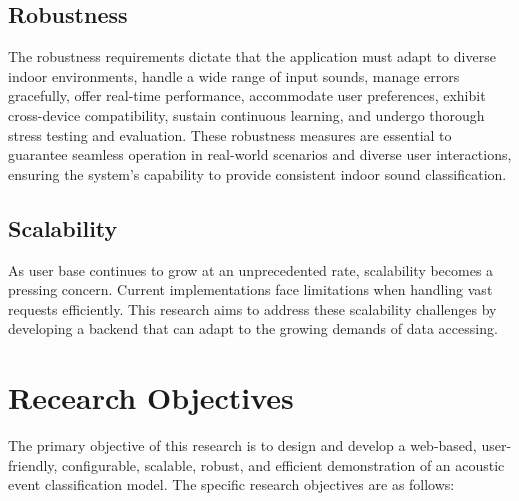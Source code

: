 \subsection{Robustness}


The robustness requirements dictate that the application must adapt to diverse indoor environments, handle a wide range of input sounds, manage errors gracefully, offer real-time performance, accommodate user preferences, exhibit cross-device compatibility, sustain continuous learning, and undergo thorough stress testing and evaluation. These robustness measures are essential to guarantee seamless operation in real-world scenarios and diverse user interactions, ensuring the system's capability to provide consistent indoor sound classification.

\subsection{Scalability}
As user base continues to grow at an unprecedented rate, scalability becomes a pressing concern\cite{9746093}. Current implementations face limitations when handling vast requests efficiently. This research aims to address these scalability challenges by developing a backend that can adapt to the growing demands of data accessing.

\section{Recearch Objectives}

The primary objective of this research is to design and develop a web-based, user-friendly, configurable, scalable, robust, and efficient demonstration of an acoustic event classification model. The specific research objectives are as follows:

